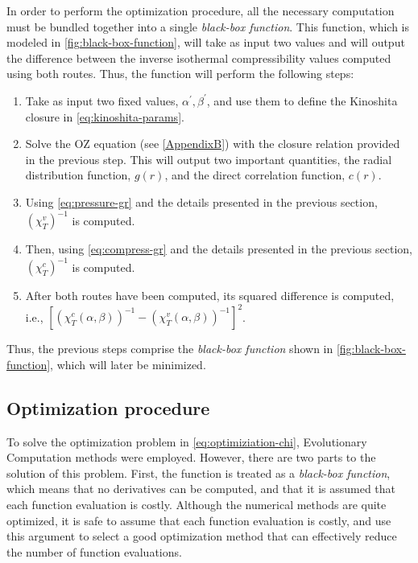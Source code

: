 In order to perform the optimization procedure, all the necessary computation must be bundled together into a single \emph{black-box function}. This function, which is modeled in \autoref{fig:black-box-function}, will take as input two values and will output the difference between the inverse isothermal compressibility values computed using both routes. Thus, the function will perform the following steps:
\begin{enumerate}
    \item Take as input two fixed values, \(\alpha^{\prime}, \beta^{\prime}\), and use them to define the Kinoshita closure in \autoref{eq:kinoshita-params}.
    \item Solve the OZ equation (see \autoref{AppendixB}) with the closure relation provided in the previous step. This will output two important quantities, the radial distribution function, \(g(r)\), and the direct correlation function, \(c(r)\).
    \item Using \autoref{eq:pressure-gr} and the details presented in the previous section, \({\left(\chi_{T}^{v}\right)}^{-1}\) is computed.
    \item Then, using \autoref{eq:compress-gr} and the details presented in the previous section, \({\left(\chi_{T}^{c}\right)}^{-1}\) is computed.
    \item After both routes have been computed, its squared difference is computed, i.e., \({\left[ {\left(\chi_{T}^{c} \left(\alpha, \beta\right) \right)}^{-1} - {\left(\chi_{T}^{v} \left(\alpha, \beta\right) \right)}^{-1} \right]}^2 \).
\end{enumerate}
Thus, the previous steps comprise the \emph{black-box function} shown in 
\autoref{fig:black-box-function}, which will later be minimized.

\subsection{Optimization procedure}
To solve the optimization problem in \autoref{eq:optimiziation-chi}, Evolutionary 
Computation methods were employed. However, there are two parts to the solution of this 
problem. First, the function is treated as a \emph{black-box function}, which means 
that no derivatives can be computed, and that it is assumed that each function evaluation 
is costly. Although the numerical methods are quite optimized, it is safe to assume that 
each function evaluation is costly, and use this argument to select a good optimization 
method that can effectively reduce the number of function evaluations.

